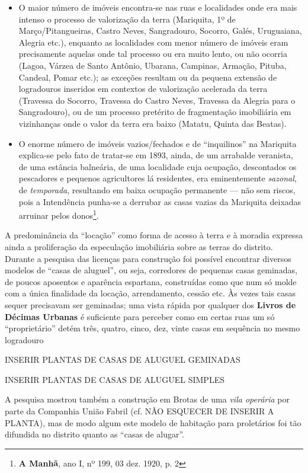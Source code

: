 \begin{itemize}
\item O maior número de imóveis encontra-se nas ruas e localidades onde era mais intenso o processo de valorização da terra (Mariquita, 1º de Março/Pitangueiras, Castro Neves, Sangradouro, Socorro, Galés, Uruguaiana, Alegria etc.), enquanto as localidades com menor número de imóveis eram precisamente aquelas onde tal processo ou era muito lento, ou não ocorria (Lagoa, Várzea de Santo Antônio, Ubarana, Campinas, Armação, Pituba, Candeal, Pomar etc.); as exceções resultam ou da pequena extensão de logradouros inseridos em contextos de valorização acelerada da terra (Travessa do Socorro, Travessa do Castro Neves, Travessa da Alegria para o Sangradouro), ou de um processo pretérito de fragmentação imobiliária em vizinhanças onde o valor da terra era baixo (Matatu, Quinta das Beatas).
\item O enorme número de imóveis vazios/fechados e de ``inquilinos'' na Mariquita explica-se pelo fato de tratar-se em 1893, ainda, de um arrabalde veranista, de uma estância balneária, de uma localidade cuja ocupação, descontados os pescadores e pequenos agricultores lá residentes, era eminentemente \textit{sazonal}, de \textit{temporada}, resultando em baixa ocupação permanente --- não sem riscos, pois a Intendência punha-se a derrubar as casas vazias da Mariquita deixadas arruinar pelos donos\footnote{\textbf{A Manhã}, ano I, nº 199, 03 dez. 1920, p. 2}.
\end{itemize}

A predominância da ``locação'' como forma de acesso à terra e à moradia expressa ainda a proliferação da especulação imobiliária sobre as terras do distrito. Durante a pesquisa das licenças para construção foi possível encontrar diversos modelos de ``casas de aluguel'', ou seja, corredores de pequenas casas geminadas, de poucos aposentos e aparência espartana, construídas como que num só molde com a única finalidade da locação, arrendamento, cessão etc. Às vezes tais casas sequer precisavam ser geminadas; uma vista rápida por qualquer dos \textbf{Livros de Décimas Urbanas} é suficiente para perceber como em certas ruas um só ``proprietário'' detém três, quatro, cinco, dez, vinte casas em sequência no mesmo logradouro

INSERIR PLANTAS DE CASAS DE ALUGUEL GEMINADAS

INSERIR PLANTAS DE CASAS DE ALUGUEL SIMPLES

A pesquisa mostrou também a construção em Brotas de uma \textit{vila operária} por parte da Companhia União Fabril (cf. NÃO ESQUECER DE INSERIR A PLANTA), mas de modo algum este modelo de habitação para proletários foi tão difundida no distrito quanto as ``casas de alugar''.

